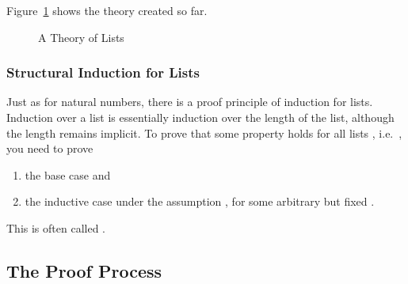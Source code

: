 \begin{isabellebody}
\begin{isamarkuptext}
Figure~\ref{fig:MyList} shows the theory created so far.

\begin{figure}[htbp]
\begin{alltt}
\end{alltt}
\caption{A Theory of Lists}
\label{fig:MyList}
\end{figure}

\subsubsection{Structural Induction for Lists}

Just as for natural numbers, there is a proof principle of induction for
lists. Induction over a list is essentially induction over the length of
the list, although the length remains implicit. To prove that some property
 holds for all lists , i.e.\ \mbox{},
you need to prove
\begin{enumerate}
\item the base case  and
\item the inductive case  under the assumption , for some arbitrary but fixed .
\end{enumerate}
This is often called .

\subsection{The Proof Process}


\end{isamarkuptext}
\end{isabellebody}
